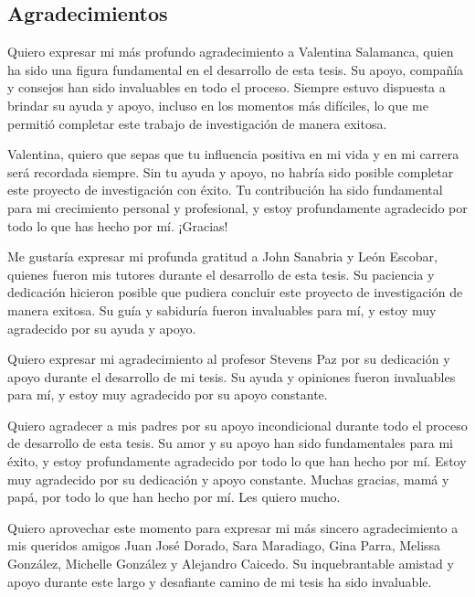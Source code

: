 \begin{spacing}{1.5}
  \begin{tightcenter}
    \section{Agradecimientos}
    \mylinespacing
  \end{tightcenter}

  Quiero expresar mi más profundo agradecimiento a Valentina Salamanca, quien ha sido una figura fundamental en el desarrollo de esta tesis. Su apoyo, compañía y consejos han sido invaluables en todo el proceso. Siempre estuvo dispuesta a brindar su ayuda y apoyo, incluso en los momentos más difíciles, lo que me permitió completar este trabajo de investigación de manera exitosa.

  Valentina, quiero que sepas que tu influencia positiva en mi vida y en mi carrera será recordada siempre. Sin tu ayuda y apoyo, no habría sido posible completar este proyecto de investigación con éxito. Tu contribución ha sido fundamental para mi crecimiento personal y profesional, y estoy profundamente agradecido por todo lo que has hecho por mí. ¡Gracias!

  Me gustaría expresar mi profunda gratitud a John Sanabria y León Escobar, quienes fueron mis tutores durante el desarrollo de esta tesis. Su paciencia y dedicación hicieron posible que pudiera concluir este proyecto de investigación de manera exitosa. Su guía y sabiduría fueron invaluables para mí, y estoy muy agradecido por su ayuda y apoyo.

  Quiero expresar mi agradecimiento al profesor Stevens Paz por su dedicación y apoyo durante el desarrollo de mi tesis. Su ayuda y opiniones fueron invaluables para mí, y estoy muy agradecido por su apoyo constante.

  Quiero agradecer a mis padres por su apoyo incondicional durante todo el proceso de desarrollo de esta tesis. Su amor y su apoyo han sido fundamentales para mi éxito, y estoy profundamente agradecido por todo lo que han hecho por mí. Estoy muy agradecido por su dedicación y apoyo constante. Muchas gracias, mamá y papá, por todo lo que han hecho por mí. Les quiero mucho.

  Quiero aprovechar este momento para expresar mi más sincero agradecimiento a mis queridos amigos Juan José Dorado, Sara Maradiago, Gina Parra, Melissa González, Michelle González y Alejandro Caicedo. Su inquebrantable amistad y apoyo durante este largo y desafiante camino de mi tesis ha sido invaluable.


\end{spacing}
